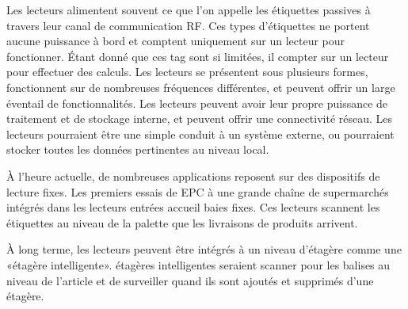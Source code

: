 \documentclass[11pt, a4paper, twoside]{book}
\begin{document}
Les lecteurs alimentent souvent ce que l'on appelle les étiquettes passives à travers leur canal de communication RF.
Ces types d'étiquettes ne portent aucune puissance à bord et comptent uniquement sur un lecteur pour fonctionner. Étant donné que ces tag sont si limitées, il compter sur un lecteur pour effectuer des calculs.
Les lecteurs se présentent sous plusieurs formes, fonctionnent sur de nombreuses fréquences différentes, et peuvent offrir un large éventail de fonctionnalités. Les lecteurs peuvent avoir leur propre puissance de traitement et de stockage interne, et peuvent offrir une connectivité réseau. Les lecteurs pourraient être une simple conduit à un système externe, ou pourraient stocker toutes les données pertinentes au niveau local.

À l'heure actuelle, de nombreuses applications reposent sur des dispositifs de lecture fixes. Les premiers essais de EPC à une grande chaîne de supermarchés intégrés dans les lecteurs entrées accueil baies fixes. Ces lecteurs scannent les étiquettes au niveau de la palette que les livraisons de produits arrivent. 

À long terme, les lecteurs peuvent être intégrés à un niveau d'étagère comme une «étagère intelligente». étagères intelligentes seraient scanner pour les balises au niveau de l'article et de surveiller quand ils sont ajoutés et supprimés d'une étagère.
\end{document}
